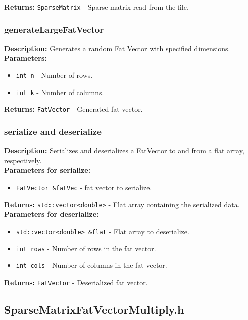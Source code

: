 \documentclass[12pt,oneside]{book} %
\begin{document}
\begin{subappendices}
    \textbf{Returns:} \texttt{SparseMatrix} - Sparse matrix read from the file.

    \subsubsection{generateLargeFatVector}
    \textbf{Description:} Generates a random Fat Vector with specified dimensions.\\

    \textbf{Parameters:}
    \begin{itemize}
        \item \texttt{int n} - Number of rows.
        \item \texttt{int k} - Number of columns.
    \end{itemize}

    \textbf{Returns:} \texttt{FatVector} - Generated fat vector.

    \subsubsection{serialize and deserialize}
    \textbf{Description:} Serializes and deserializes a FatVector to and from a flat array, respectively.\\

    \textbf{Parameters for serialize:}
    \begin{itemize}
        \item \texttt{FatVector \&fatVec} - fat vector to serialize.
    \end{itemize}

    \textbf{Returns:} \texttt{std::vector<double>} - Flat array containing the serialized data.\\

    \textbf{Parameters for deserialize:}
    \begin{itemize}
        \item \texttt{std::vector<double> \&flat} - Flat array to deserialize.
        \item \texttt{int rows} - Number of rows in the fat vector.
        \item \texttt{int cols} - Number of columns in the fat vector.
    \end{itemize}

    \textbf{Returns:} \texttt{FatVector} - Deserialized fat vector.

    \subsection{SparseMatrixFatVectorMultiply.h}

\end{subappendices}
\end{document}
